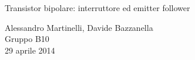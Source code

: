\begin{center}

     	{\huge Transistor bipolare: interruttore ed emitter follower}

	\vspace{0.3cm}

      	{\large Alessandro Martinelli, Davide Bazzanella} \\
     	\vspace{0.2cm}
		{\huge Gruppo B10} \\
	
	\vspace{0.1cm}
      	{29 aprile 2014}

\end{center}
